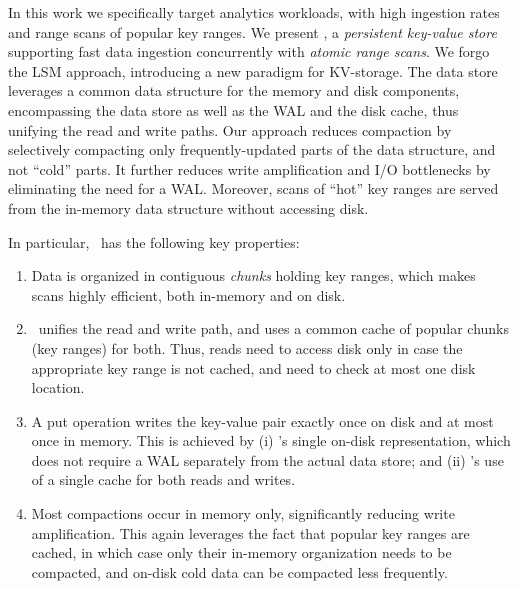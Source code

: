 In this work we specifically target analytics workloads, with high ingestion rates and range scans of popular key ranges. 
We present \sys,  a \emph{persistent key-value store} supporting fast data ingestion concurrently with 
\emph{atomic range scans}. 
We forgo the  LSM approach, introducing  a new paradigm for KV-storage.
The data store leverages  a common data structure for the memory and disk components, 
encompassing the data store as well as the WAL and the disk cache, thus unifying the read and write paths. 
Our approach reduces compaction by selectively compacting only frequently-updated parts of the data structure, and not ``cold'' parts.
It further reduces write amplification and I/O bottlenecks by eliminating the need for a WAL.
Moreover, scans of ``hot'' key ranges are served from the in-memory data structure without accessing disk.

In particular, \sys\ has the following key properties: 
\begin{enumerate}
\item Data is organized in contiguous \emph{chunks} holding key ranges, which makes scans highly efficient, both in-memory and on disk. 
\item \sys\ unifies the read and write path, and uses a common cache of popular chunks (key ranges) for both. Thus, reads need to access disk only in case the appropriate key 
range is not cached, and need to check at most one disk location. 
\item A put operation writes the key-value pair exactly once on disk and at most once in memory.
This is achieved by (i) \sys's single on-disk representation, which does not require a WAL separately from the actual data store; and 
(ii) \sys's use of a single cache for both reads and writes. 
\item Most compactions occur in memory only, significantly reducing write amplification. This again leverages the fact that 
popular key ranges are cached, in which case only their in-memory organization needs to be compacted, and on-disk cold data
can be compacted less frequently. 
  \end{enumerate}


